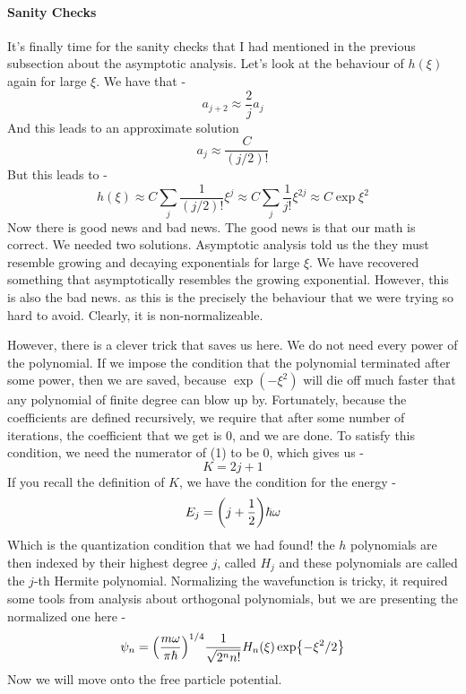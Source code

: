 \paragraph{Sanity Checks}
It's finally time for the sanity checks that I had mentioned in the previous subsection about the asymptotic analysis. Let's look at the behaviour of $h(\xi)$ again for large $\xi$. We have that -
\begin{equation*}
  a_{j+2}\approx\dfrac{2}{j}a_j
\end{equation*}
And this leads to an approximate solution
\begin{equation*}
  a_j\approx\dfrac{C}{(j/2)!}
\end{equation*}
But this leads to -
\begin{equation*}
  h(\xi)\approx C\sum_j\dfrac{1}{(j/2)!}\xi^j
  \approx C\sum_j\dfrac{1}{j!}\xi^{2j}
  \approx C\exp{\xi^2}
\end{equation*}
Now there is good news and bad news. The good news is that our math is correct. We needed two solutions. Asymptotic analysis told us the they must resemble growing and decaying exponentials for large $\xi$. We have recovered something that asymptotically resembles the growing exponential. However, this is also the bad news. as this is the precisely the behaviour that we were trying so hard to avoid. Clearly, it is non-normalizeable.

However, there is a clever trick that saves us here. We do not need every power of the polynomial. If we impose the condition that the polynomial terminated after some power, then we are saved, because $\exp(-\xi^{2})$ will die off much faster that any polynomial of finite degree can blow up by. Fortunately, because the coefficients are defined recursively, we require that after some number of iterations, the coefficient that we get is $0$, and we are done. To satisfy this condition, we need the numerator of (1) to be $0$, which gives us -
\begin{equation*}
    K=2j+1
\end{equation*}
If you recall the definition of $K$, we have the condition for the energy -
\begin{equation*}
    E_j=\qty(j+\dfrac{1}{2})\hbar\omega
\end{equation*}
Which is the quantization condition that we had found! the $h$ polynomials are then indexed by their highest degree $j$, called $H_{j}$ and these polynomials are called the $j$-th Hermite polynomial. Normalizing the wavefunction is tricky, it required some tools from analysis about orthogonal polynomials, but we are presenting the normalized one here -
\begin{equation*}
  \psi_n=\qty(\dfrac{m\omega}{\pi\hbar})^{1/4}\dfrac{1}{\sqrt{2^nn!}}H_n(\xi)\exp{-\xi^2/2}
\end{equation*}
Now we will move onto the free particle potential.
